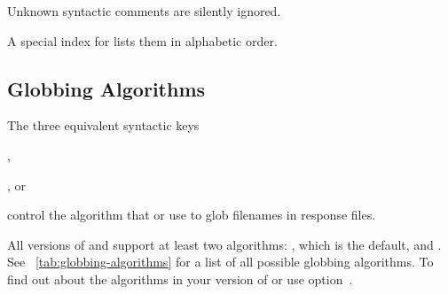 Unknown syntactic comments are silently ignored.

A special index for  lists them in
alphabetic order.


\subsection[Globbing Algorithms]{\label{sec:globbing-algorithms}%
  Globbing Algorithms}

The three equivalent syntactic keys

\begin{compactitemize}
\item
  ,

\item
  , or

\item
\end{compactitemize}

\noindent control the algorithm that \App{} or \OtherApp{} use to glob filenames in response
files.

%
%
All versions of \App{} and \OtherApp{} support at least two algorithms: , which is
the default, and .  See \tableName~\ref{tab:globbing-algorithms} for a list of
all possible globbing algorithms.  To find out about the algorithms in your version of \App{} or
\OtherApp{} use option~.

